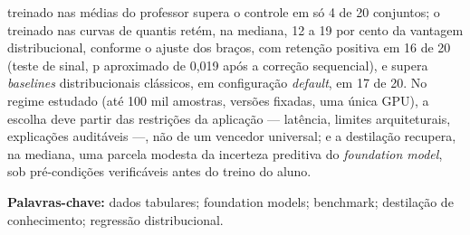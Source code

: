treinado nas médias do professor supera o controle em só 4 de 20
conjuntos; o treinado nas curvas de quantis retém, na mediana, 12 a
19 por cento da vantagem distribucional, conforme o ajuste dos
braços, com retenção positiva em 16 de 20 (teste de
sinal, p aproximado de 0,019 após a correção sequencial), e supera \emph{baselines} distribucionais clássicos, em configuração
\emph{default}, em 17 de
20. No regime estudado (até 100 mil amostras, versões fixadas, uma
única GPU), a escolha deve
partir das restrições da aplicação --- latência, limites
arquiteturais, explicações auditáveis ---, não de um vencedor
universal;
e a destilação
recupera, na mediana, uma parcela modesta da incerteza preditiva do
\emph{foundation model}, sob pré-condições verificáveis antes do
treino do aluno.

\vspace{1cm}
\noindent\textbf{Palavras-chave:} dados tabulares; foundation models;
benchmark; destilação de conhecimento; regressão distribucional.
